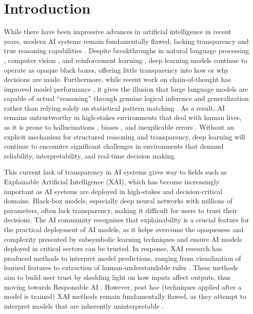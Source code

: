 
\chapter{Introduction}
\label{chap:introduction}

While there have been impressive advances in artificial intelligence in recent years, modern AI systems remain fundamentally flawed, lacking transparency and true reasoning capabilities \cite{jiang2024peektokenbiaslarge}. Despite breakthroughs in natural language processing \cite{nlp_deep_learning_survey}, computer vision \cite{cv_deep_learning_survey}, and reinforcement learning \cite{rl_deep_learning_survey}, deep learning models continue to operate as opaque black boxes, offering little transparency into how or why decisions are made. Furthermore, while recent work on chain-of-thought has improved model performance \cite{wei2023chainofthoughtpromptingelicitsreasoning}, it gives the illusion that large language models are capable of actual ``reasoning'' through genuine logical inference and generalization rather than relying solely on statistical pattern matching \cite{bastounis2024consistentreasoningparadoxintelligence, li202512surveyreasoning, cherian2023deepneuralnetworkssmarter}. As a result, AI remains untrustworthy in high-stakes environments that deal with human lives, as it is prone to hallucinations \cite{maleki2024aihallucinationsmisnomerworth}, biases \cite{simhi2025trustmeimwrong, echterhoff2024cognitivebiasdecisionmakingllms}, and inexplicable errors \cite{rogha2023explaindecidehumancentricreview}. Without an explicit mechanism for structured reasoning and transparency, deep learning will continue to encounter significant challenges in environments that demand reliability, interpretability, and real-time decision making.

This current lack of transparency in AI systems gives way to fields such as Explainable Artificial Intelligence (XAI), which has become increasingly important as AI systems are deployed in high-stakes and decision-critical domains. Black-box models, especially deep neural networks with millions of parameters, often lack transparency, making it difficult for users to trust their decisions. The AI community recognizes that explainability is a crucial feature for the practical deployment of AI models, as it helps overcome the opaqueness and complexity presented by subsymbolic learning techniques and ensure AI models deployed in critical sectors can be trusted.
In response, XAI research has produced methods to interpret model predictions, ranging from visualization of learned features to extraction of human-understandable rules \cite{interpreting-nns}. These methods aim to build user trust by shedding light on how inputs affect outputs, thus moving towards Responsible AI \cite{baker2023explainableairesponsibleai}. However, post hoc (techniques applied after a model is trained) XAI methods remain fundamentally flawed, as they attempt to interpret models that are inherently uninterpretable \cite{inscrutable_xai_algorithms}. 

